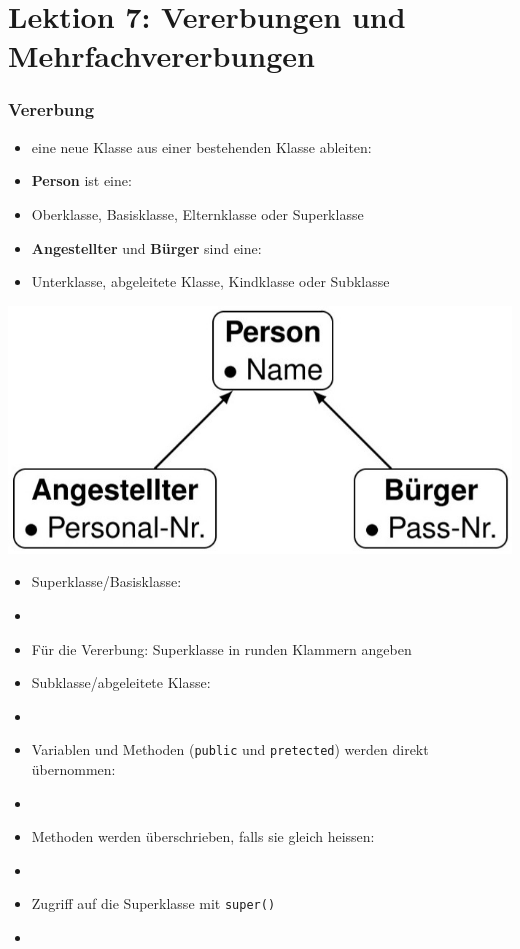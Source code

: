 \part*{Lektion 7: Vererbungen und Mehrfachvererbungen}
\section{Vererbung}
\begin{multicols}{2}
\begin{itemize}
	\item eine neue Klasse aus einer bestehenden Klasse ableiten:
	\item \textbf{Person} ist eine:
	\item[\-] Oberklasse, Basisklasse, Elternklasse oder Superklasse
	\item \textbf{Angestellter} und \textbf{Bürger} sind eine:
	\item[\-] Unterklasse, abgeleitete Klasse, Kindklasse oder Subklasse
\end{itemize}
\columnbreak
\includegraphics[width=0.8\linewidth]{images/v7_vererbung1}
\end{multicols}

\begin{itemize}
	\item Superklasse/Basisklasse:
	\item[\-] 
	\item Für die Vererbung: Superklasse in runden Klammern angeben
	\item Subklasse/abgeleitete Klasse:
	\item[\-] 
	\item Variablen und Methoden (\texttt{public} und \texttt{pretected}) werden direkt übernommen:
	\item[\-] 
	\item Methoden werden überschrieben, falls sie gleich heissen:
	\item[\-] 
	\item Zugriff auf die Superklasse mit \texttt{super()}
	\item[\-] 
\end{itemize}

